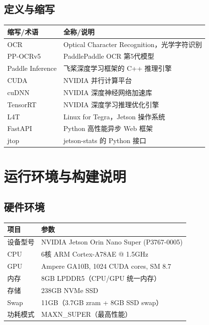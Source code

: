 \documentclass[12pt,a4paper]{ctexart}
\begin{document}
\subsection{定义与缩写}
\begin{longtable}{|p{3cm}|p{10cm}|}\hline
\textbf{缩写/术语} & \textbf{全称/说明} \\\hline
OCR & Optical Character Recognition，光学字符识别 \\\hline
PP-OCRv5 & PaddlePaddle OCR 第5代模型 \\\hline
Paddle Inference & 飞桨深度学习框架的 C++ 推理引擎 \\\hline
CUDA & NVIDIA 并行计算平台 \\\hline
cuDNN & NVIDIA 深度神经网络加速库 \\\hline
TensorRT & NVIDIA 深度学习推理优化引擎 \\\hline
L4T & Linux for Tegra，Jetson 操作系统 \\\hline
FastAPI & Python 高性能异步 Web 框架 \\\hline
jtop & jetson-stats 的 Python 接口 \\\hline
\end{longtable}

\section{运行环境与构建说明}

\subsection{硬件环境}
\begin{longtable}{|p{5cm}|p{8cm}|}\hline
\textbf{项目} & \textbf{参数} \\\hline
设备型号 & NVIDIA Jetson Orin Nano Super (P3767-0005) \\\hline
CPU & 6核 ARM Cortex-A78AE @ 1.5GHz \\\hline
GPU & Ampere GA10B, 1024 CUDA cores, SM 8.7 \\\hline
内存 & 8GB LPDDR5（CPU/GPU 统一内存） \\\hline
存储 & 238GB NVMe SSD \\\hline
Swap & 11GB（3.7GB zram + 8GB SSD swap） \\\hline
功耗模式 & MAXN\_SUPER（最高性能） \\\hline
\end{longtable}
\end{document}
